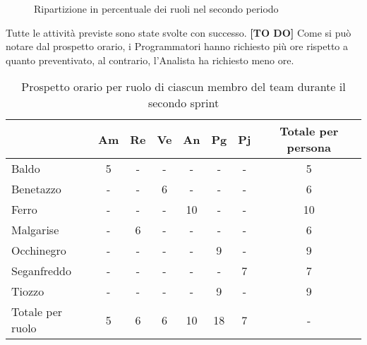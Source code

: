 \begin{figure*}
    \centering
    \caption{Ripartizione in percentuale dei ruoli nel secondo periodo}
    \label{fig:4}
\end{figure*}

\newblock
\newpage
{}
Tutte le attività previste sono state svolte con successo. \textbf{[TO DO]}
Come si può notare dal prospetto orario, i Programmatori hanno richiesto più ore rispetto a quanto preventivato, al contrario, l'Analista
ha richiesto meno ore.
\begin{table}[!h]
    \centering
    \begin{tabular}{ | l | c | c | c | c | c | c | c |} 
        \hline
        \textbf{} & \textbf{Am} & \textbf{Re} & \textbf{Ve} &\textbf{An} & \textbf{Pg} & \textbf{Pj} & \textbf{Totale per persona} \\
        \hline 
        Baldo            &  5   &  -   &  -   &  -   &  -   &  -   &  5   \\ 
        Benetazzo        &  -   &  -   &  6   &  -   &  -   &  -   &  6   \\ 
        Ferro            &  -   &  -   &  -   & 10   &  -   &  -   & 10   \\ 
        Malgarise        &  -   &  6   &  -   &  -   &  -   &  -   &  6   \\ 
        Occhinegro       &  -   &  -   &  -   &  -   &  9   &  -   &  9   \\ 
        Seganfreddo      &  -   &  -   &  -   &  -   &  -   &  7   &  7   \\
        Tiozzo           &  -   &  -   &  -   &  -   &  9   &  -   &  9   \\ 
        \hline
        Totale per ruolo &  5   &  6   &  6   & 10   & 18   &  7   &  -   \\
        \hline
    \end{tabular}
    \caption{Prospetto orario per ruolo di ciascun membro del team durante il secondo sprint}
    \label{tab:6}
\end{table}

